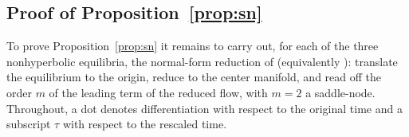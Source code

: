 \documentclass[reqno,11pt]{amsart}
\numberwithin{equation}{section}
\begin{document}
\begin{appendix}
\section{Proof of Proposition~\ref{prop:sn}}\label{app:proofs}
To prove Proposition~\ref{prop:sn} it remains to carry out, for each of the three nonhyperbolic equilibria, the normal-form reduction of \cite[Thm.~1, Sec.~2.11]{Pe01} (equivalently \cite[Thm.~7.1, Chap.~2]{Zha92}): translate the equilibrium to the origin, reduce to the center manifold, and read off the order $m$ of the leading term of the reduced flow, with $m=2$ a saddle-node. Throughout, a dot denotes differentiation with respect to the original time and a subscript $\tau$ with respect to the rescaled time.\\


\end{appendix}
\end{document}
